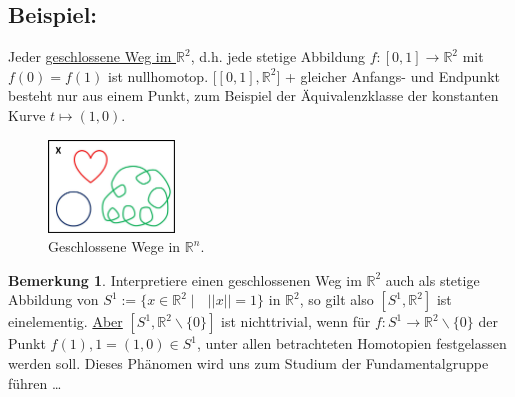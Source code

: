 \documentclass[a4paper,11pt,notitlepage]{report}
\theoremstyle{definition}
\newtheorem{remark}{Bemerkung}[chapter]
\newcommand{\R}{{\ensuremath{\mathbb{R}}}}
\newenvironment{bsp}[1]
{
\setlength{\fboxsep}{10pt}
\subsection*{Beispiel: #1}
\begin{upshape}
}
{
\end{upshape}
}
\begin{document}
\begin{bsp}{}
Jeder \underline{geschlossene Weg im $\R^2$}, d.h. jede stetige Abbildung $f \colon [0,1] \rightarrow \R^2$ mit $f(0) = f(1)$ ist nullhomotop.
$\bigl[[0,1], \R^2\bigr]$ + gleicher Anfangs- und Endpunkt besteht nur aus einem Punkt, zum Beispiel der Äquivalenzklasse der konstanten Kurve $t \mapsto (1,0)$.

\begin{figure}[h]
\centering
\includegraphics[width=0.3\textwidth]{images/Geschlossene_Wege.jpg}
\caption{Geschlossene Wege in $\R^n$.}
\end{figure}

\begin{remark}{}\label{nichttrivial}
Interpretiere einen geschlossenen Weg im $\R^2$ auch als stetige Abbildung von $S^1 := \{ x \in \R^2 \mid \text{ } ||x|| = 1\}$ in $\R^2$, so gilt also $[S^1, \R^2]$ ist einelementig.
\newline
\underline{Aber} $[S^1, \R^2 \backslash \{0\}]$ ist nichttrivial, wenn für $f \colon S^1 \rightarrow \R^2 \backslash \{0\}$ der Punkt $f(1), 1 = (1,0) \in S^1$, unter allen betrachteten Homotopien festgelassen werden soll. Dieses Phänomen wird uns zum Studium der Fundamentalgruppe führen \ldots
\end{remark}


\end{bsp}
\end{document}

